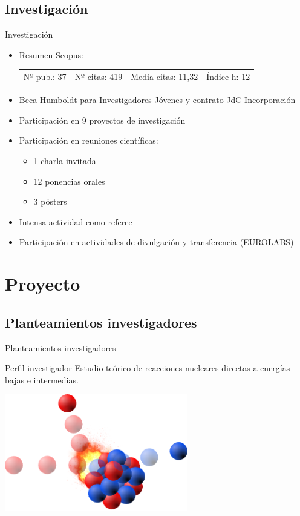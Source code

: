 \documentclass{beamer}
\begin{document}
\subsection{Investigación}
\begin{frame}{Investigación}
    \begin{itemize}
        \item Resumen Scopus:
        \begin{center}
        \begin{tabular}{cccc}
        Nº pub.: 37 & Nº citas: 419 & Media citas: 11,32 & Índice h: 12
        \end{tabular}
        \end{center}
        \item Beca Humboldt para Investigadores Jóvenes y contrato JdC Incorporación
    \item Participación en 9 proyectos de investigación
    \item Participación en reuniones científicas:
    \begin{itemize}
    \item 1 charla invitada
    \item 12 ponencias orales
    \item 3 pósters
    \end{itemize}
    \item Intensa actividad como referee
    \item Participación en actividades de divulgación y transferencia (EUROLABS)
    \end{itemize}
\end{frame}

\section{Proyecto}
\subsection{Planteamientos investigadores}
\begin{frame}{Planteamientos investigadores}
    \begin{block}{Perfil investigador}
       Estudio teórico de reacciones nucleares directas a energías bajas e intermedias.
    \end{block}
    \begin{center}
    \includegraphics[width=0.6\textwidth]{portada.png}
    \end{center}
\end{frame}
\end{document}
